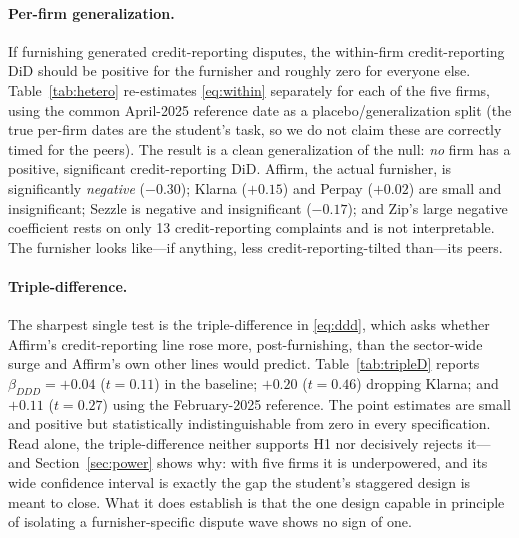 \documentclass[12pt]{article}
\begin{document}
\paragraph{Per-firm generalization.} If furnishing generated credit-reporting disputes, the
within-firm credit-reporting DiD should be positive for the furnisher and roughly zero for
everyone else. Table~\ref{tab:hetero} re-estimates \eqref{eq:within} separately for each of the
five firms, using the common April-2025 reference date as a placebo/generalization split (the
true per-firm dates are the student's task, so we do not claim these are correctly timed for the
peers). The result is a clean generalization of the null: \emph{no} firm has a positive,
significant credit-reporting DiD. Affirm, the actual furnisher, is significantly \emph{negative}
($-0.30$); Klarna ($+0.15$) and Perpay ($+0.02$) are small and insignificant; Sezzle is
negative and insignificant ($-0.17$); and Zip's large negative coefficient rests on only 13
credit-reporting complaints and is not interpretable. The furnisher looks like---if anything,
less credit-reporting-tilted than---its peers.

\paragraph{Triple-difference.} The sharpest single test is the triple-difference in
\eqref{eq:ddd}, which asks whether Affirm's credit-reporting line rose more, post-furnishing,
than the sector-wide surge and Affirm's own other lines would predict. Table~\ref{tab:tripleD}
reports $\beta_{DDD}=+0.04$ ($t=0.11$) in the baseline; $+0.20$ ($t=0.46$) dropping Klarna; and
$+0.11$ ($t=0.27$) using the February-2025 reference. The point estimates are small and
positive but statistically indistinguishable from zero in every specification. Read alone, the
triple-difference neither supports H1 nor decisively rejects it---and Section~\ref{sec:power}
shows why: with five firms it is underpowered, and its wide confidence interval is exactly the
gap the student's staggered design is meant to close. What it does establish is that the one
design capable in principle of isolating a furnisher-specific dispute wave shows no sign of one.
\end{document}

